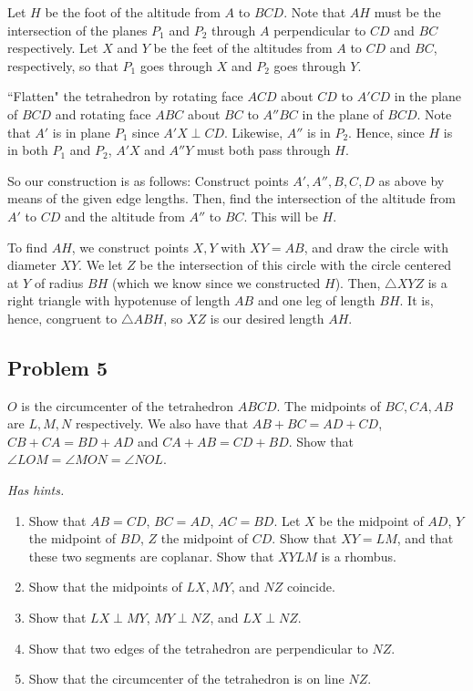\begin{mdsoln}
Let $H$ be the foot of the altitude from $A$ to $BCD$. Note that $AH$ must be the intersection of the planes $P_1$ and $P_2$ through $A$ perpendicular to $CD$ and $BC$ respectively. Let $X$ and $Y$ be the feet of the altitudes from $A$ to $CD$ and $BC$, respectively, so that $P_1$ goes through $X$ and $P_2$ goes through $Y$.

``Flatten" the tetrahedron by rotating face $ACD$ about $CD$ to $A'CD$ in the plane of $BCD$ and rotating face $ABC$ about $BC$ to $A''BC$ in the plane of $BCD$. Note that $A'$ is in plane $P_1$ since $A'X\perp CD$. Likewise, $A''$ is in $P_2$. Hence, since $H$ is in both $P_1$ and $P_2$, $A'X$ and $A''Y$ must both pass through $H$.

So our construction is as follows: Construct points $A',A'',B,C,D$ as above by means of the given edge lengths. Then, find the intersection of the altitude from $A'$ to $CD$ and the altitude from $A''$ to $BC$. This will be $H$.

To find $AH$, we construct points $X,Y$ with $XY=AB$, and draw the circle with diameter $XY$. We let $Z$ be the intersection of this circle with the circle centered at $Y$ of radius $BH$ (which we know since we constructed $H$). Then, $\triangle XYZ$ is a right triangle with hypotenuse of length $AB$ and one leg of length $BH$. It is, hence, congruent to $\triangle ABH$, so $XZ$ is our desired length $AH$.    
\end{mdsoln}

\subsection{Problem 5}

$O$ is the circumcenter of the tetrahedron $ABCD$. The midpoints of $BC, CA, AB$ are $L, M, N$ respectively. We also have that $AB + BC = AD + CD$, $CB + CA = BD + AD$ and $CA + AB = CD + BD$. Show that $\angle LOM = \angle MON = \angle NOL$.

\textit{Has hints.}
\begin{sketch}
    \begin{enumerate}
        \item Show that $AB = CD$, $BC = AD$, $AC = BD$. Let $X$ be the midpoint of $AD$, $Y$ the midpoint of $BD$, $Z$ the midpoint of $CD$. Show that $XY = LM$, and that these two segments are coplanar. Show that $XYLM$ is a rhombus.
        \item Show that the midpoints of $LX, MY$, and $NZ$ coincide.
        \item Show that $LX\perp MY$, $MY\perp NZ$, and $LX\perp NZ$.
        \item Show that two edges of the tetrahedron are perpendicular to $NZ$.
        \item Show that the circumcenter of the tetrahedron is on line $NZ$.
    \end{enumerate}
\end{sketch}

